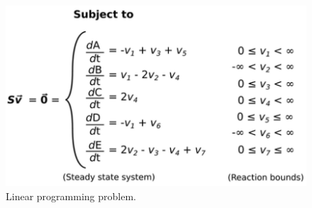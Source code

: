 \documentclass[8pt]{beamer}
\begin{document}
\begin{frame}
{\begin{minipage}{0.5\textwidth}
\end{minipage}%
\begin{minipage}{0.5\textwidth}
\begin{figure}
\includegraphics[width=\textwidth]{figures/mass-balance-3}
\caption{Linear programming problem.}
\end{figure}

\end{minipage}



}
\end{frame}
\end{document}
